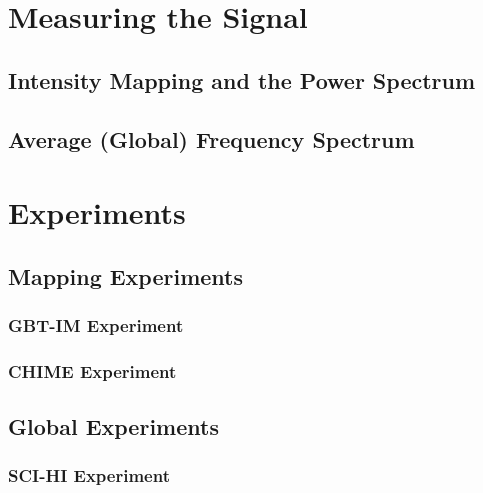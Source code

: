 \section{Measuring the \cm Signal}

\subsection{Intensity Mapping and the \cm Power Spectrum}

\subsection{Average (Global) \cm Frequency Spectrum}

\section{\cm Experiments}

\subsection{Mapping Experiments}

\subsubsection{GBT-IM Experiment}

\subsubsection{CHIME Experiment}

\subsection{Global Experiments}

\subsubsection{SCI-HI Experiment}